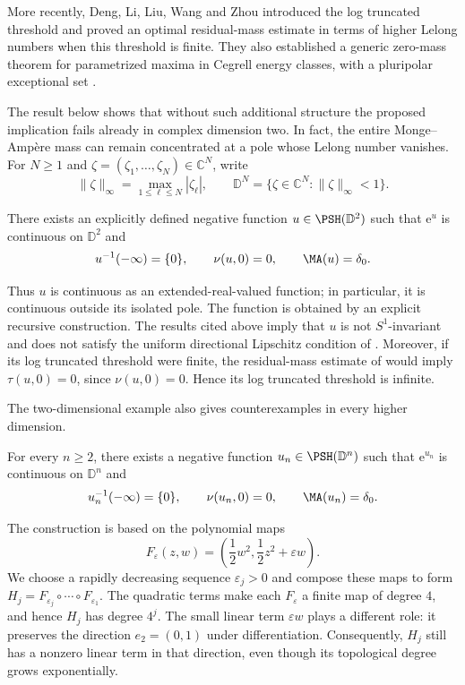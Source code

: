 \documentclass[11pt,a4paper]{article}
\newcommand{\e}{\mathrm e}
\begin{document}
More recently, Deng, Li, Liu, Wang and Zhou introduced the log truncated threshold and proved an optimal residual-mass estimate in terms of higher Lelong numbers when this threshold is finite. They also established a generic zero-mass theorem for parametrized maxima in Cegrell energy classes, with a pluripolar exceptional set \cite{DLLWZ26}.

The result below shows that without such additional structure the proposed implication fails already in complex dimension two. In fact, the entire Monge--Amp\`ere mass can remain concentrated at a pole whose Lelong number vanishes. For $N\ge1$ and $\zeta=(\zeta_1,\ldots,\zeta_N)\in\mathbb C^N$, write
\[
  \|\zeta\|_\infty=\max_{1\le\ell\le N}|\zeta_\ell|,
  \qquad
  \mathbb D^N=\{\zeta\in\mathbb C^N:\|\zeta\|_\infty<1\}.
\]
\begin{theorem}\label{thm:main}
There exists an explicitly defined negative function $u\in\PSH(\mathbb D^2)$ such that $\e^u$ is continuous on $\mathbb D^2$ and
\begin{equation}\label{eq:main}
  u^{-1}(-\infty)=\{0\},
  \qquad
  \nu(u,0)=0,
  \qquad
  \MA(u)=\delta_0.
\end{equation}
\end{theorem}

Thus $u$ is continuous as an extended-real-valued function; in particular, it is continuous outside its isolated pole. The function is obtained by an explicit recursive construction. The results cited above imply that $u$ is not $S^1$-invariant and does not satisfy the uniform directional Lipschitz condition of \cite{HLX25}. Moreover, if its log truncated threshold were finite, the residual-mass estimate of \cite[Theorem~1.3]{DLLWZ26} would imply $\tau(u,0)=0$, since $\nu(u,0)=0$. Hence its log truncated threshold is infinite.

The two-dimensional example also gives counterexamples in every higher dimension.

\begin{corollary}\label{cor:higher-dimensional}
For every $n\ge2$, there exists a negative function $u_n\in\PSH(\mathbb D^n)$ such that $\e^{u_n}$ is continuous on $\mathbb D^n$ and
\[
  u_n^{-1}(-\infty)=\{0\},
  \qquad
  \nu(u_n,0)=0,
  \qquad
  \MA(u_n)=\delta_0.
\]
\end{corollary}

The construction is based on the polynomial maps
\[
  F_\varepsilon(z,w)=\left(\frac{1}{2}w^2,\frac{1}{2}z^2+\varepsilon w\right).
\]
We choose a rapidly decreasing sequence $\varepsilon_j>0$ and compose these maps to form $H_j=F_{\varepsilon_j}\circ\cdots\circ F_{\varepsilon_1}$. The quadratic terms make each $F_\varepsilon$ a finite map of degree $4$, and hence $H_j$ has degree $4^j$. The small linear term $\varepsilon w$ plays a different role: it preserves the direction $e_2=(0,1)$ under differentiation. Consequently, $H_j$ still has a nonzero linear term in that direction, even though its topological degree grows exponentially.
\end{document}
